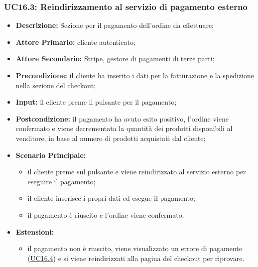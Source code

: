             \subsubsection{UC16.3: Reindirizzamento al servizio di pagamento esterno}
            \label{sec:UC16.3}
                \begin{itemize}
                    \item \textbf{Descrizione:} Sezione per il pagamento dell'ordine da effettuare;
                    \item \textbf{Attore Primario:} cliente autenticato;
                    \item \textbf{Attore Secondario:} Stripe, gestore di pagamenti di terze parti;
                    \item \textbf{Precondizione:} il cliente ha inserito i dati per la fatturazione e la spedizione nella sezione del checkout;
                    \item \textbf{Input:} il cliente preme il pulsante per il pagamento;
                    \item \textbf{Postcondizione:} il pagamento ha avuto esito positivo, l'ordine viene confermato e viene decrementata la quantità dei prodotti disponibili al venditore, in base al numero di prodotti acquistati dal cliente;
                    \item \textbf{Scenario Principale:}
                    \begin{itemize}
                        \item il cliente preme sul pulsante e viene reindirizzato al servizio esterno per eseguire il pagamento;
                        \item il cliente inserisce i propri dati ed esegue il pagamento;
                        \item il pagamento è riuscito e l'ordine viene confermato.
                    \end{itemize}
                    \item \textbf{Estensioni:}
                    \begin{itemize}
                        \item il pagamento non è riuscito, viene visualizzato un errore di pagamento (\hyperref[sec:UC16.4]{UC16.4}) e si viene reindirizzati alla pagina del checkout per riprovare.
                    \end{itemize}
                \end{itemize}
